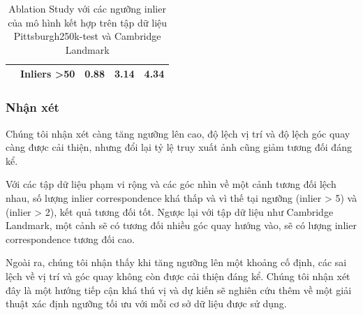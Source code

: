 \begin{table}[H]
\begin{tabular}{|c|c|c|c|c|}
                                                                                                                                   & Inliers \textgreater 50                                     & 0.88                                                                & 3.14                                                                     & 4.34                                                                         \\ \hline
\end{tabular}
\caption{Ablation Study với các ngưỡng inlier của mô hình kết hợp trên tập dữ liệu Pittsburgh250k-test \cite{6618963} và Cambridge Landmark \cite{kendall2016posenet}}
\end{table}
\egroup
\subsubsection*{Nhận xét}
Chúng tôi nhận xét càng tăng ngưỡng lên cao, độ lệch vị trí và độ lệch góc quay càng được cải thiện, nhưng đổi lại tỷ lệ truy xuất ảnh cũng giảm tương đối đáng kể. 

Với các tập dữ liệu phạm vi rộng và các góc nhìn về một cảnh tương đối lệch nhau, số lượng inlier correspondence khá thấp và vì thế tại ngưỡng (inlier > 5) và (inlier > 2), kết quả tương đối tốt. Ngược lại với tập dữ liệu như Cambridge Landmark, một cảnh sẽ có tương đối nhiều góc quay hướng vào, sẽ có lượng inlier correspondence tương đối cao. 

Ngoài ra, chúng tôi nhận thấy khi tăng ngưỡng lên một khoảng cố định, các sai lệch về vị trí và góc quay không còn được cải thiện đáng kể. Chúng tôi nhận xét đây là một hướng tiếp cận khá thú vị và dự kiến sẽ nghiên cứu thêm về một giải thuật xác định ngưỡng tối ưu với mỗi cơ sở dữ liệu được sử dụng.

